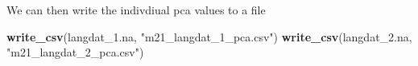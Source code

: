 \documentclass[
]{article}
\newenvironment{Shaded}{\begin{snugshade}}{\end{snugshade}}
\newcommand{\FunctionTok}[1]{\textcolor[rgb]{0.13,0.29,0.53}{\textbf{#1}}}
\newcommand{\NormalTok}[1]{#1}
\newcommand{\StringTok}[1]{\textcolor[rgb]{0.31,0.60,0.02}{#1}}
\begin{document}
We can then write the indivdiual pca values to a file

\begin{Shaded}
\begin{Highlighting}[]
\FunctionTok{write\_csv}\NormalTok{(langdat\_1.na, }\StringTok{"m21\_langdat\_1\_pca.csv"}\NormalTok{)}
\FunctionTok{write\_csv}\NormalTok{(langdat\_2.na, }\StringTok{"m21\_langdat\_2\_pca.csv"}\NormalTok{)}
\end{Highlighting}
\end{Shaded}
\end{document}
